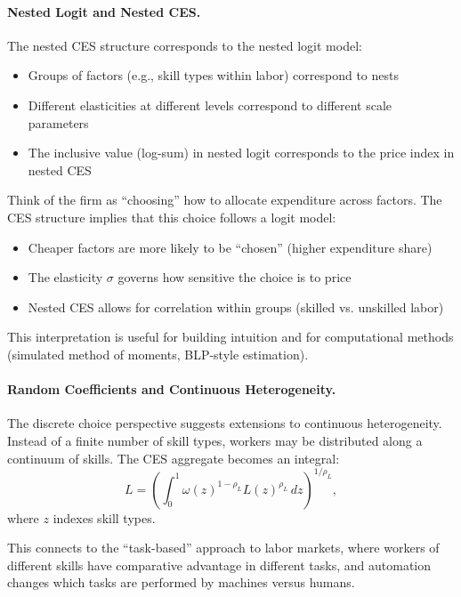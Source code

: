 \paragraph{Nested Logit and Nested CES.}
The nested CES structure corresponds to the nested logit model:
\begin{itemize}[nosep]
\item Groups of factors (e.g., skill types within labor) correspond to nests
\item Different elasticities at different levels correspond to different scale parameters
\item The inclusive value (log-sum) in nested logit corresponds to the price index in nested CES
\end{itemize}

\begin{calloutimportant}
Think of the firm as ``choosing'' how to allocate expenditure across factors. The CES structure implies that this choice follows a logit model:
\begin{itemize}[nosep]
\item Cheaper factors are more likely to be ``chosen'' (higher expenditure share)
\item The elasticity $\sigma$ governs how sensitive the choice is to price
\item Nested CES allows for correlation within groups (skilled vs. unskilled labor)
\end{itemize}
This interpretation is useful for building intuition and for computational methods (simulated method of moments, BLP-style estimation).
\end{calloutimportant}

\paragraph{Random Coefficients and Continuous Heterogeneity.}
The discrete choice perspective suggests extensions to continuous heterogeneity. Instead of a finite number of skill types, workers may be distributed along a continuum of skills. The CES aggregate becomes an integral:
\begin{equation}
L = \left( \int_0^1 \omega(z)^{1-\rho_L} L(z)^{\rho_L} \, dz \right)^{1/\rho_L},
\label{eq:continuous-ces}
\end{equation}
where $z$ indexes skill types.

This connects to the ``task-based'' approach to labor markets, where workers of different skills have comparative advantage in different tasks, and automation changes which tasks are performed by machines versus humans.

